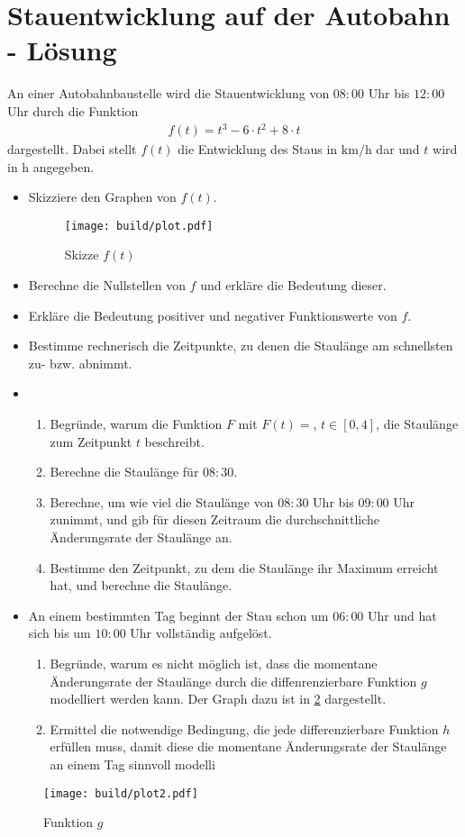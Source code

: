



\section{Stauentwicklung auf der Autobahn - Lösung}

An einer Autobahnbaustelle wird die Stauentwicklung von $08:00$ Uhr bis $12:00$ Uhr durch die Funktion
\begin{align*}
    f(t) = t^3-6\cdot t^2+8\cdot t
\end{align*}
dargestellt.
Dabei stellt $f(t)$ die Entwicklung des Staus in $\si{\kilo\meter\per\hour}$ dar und $t$ wird in $\si{\hour}$ angegeben.

\begin{itemize}
    \item Skizziere den Graphen von $f(t)$.
        \begin{figure}[H]
            \centering
            \texttt{[image: build/plot.pdf]}
            \caption{Skizze $f(t)$}
            \label{fig:f(t)}
        \end{figure}
    \item Berechne die Nullstellen von $f$ und erkläre die Bedeutung dieser.
    \item Erkläre die Bedeutung positiver und negativer Funktionswerte von $f$.
    \item Bestimme rechnerisch die Zeitpunkte, zu denen die Staulänge am schnellsten zu- bzw. abnimmt.
    \item 
        \begin{enumerate}
            \item Begründe, warum die Funktion $F$ mit $F(t) = $, $t \in \left[0,4\right]$, die Staulänge zum Zeitpunkt $t$ beschreibt.
            \item Berechne die Staulänge für $08:30$.
            \item Berechne, um wie viel die Staulänge von $08:30$ Uhr bis $09:00$ Uhr zunimmt, und gib für diesen Zeitraum die durchschnittliche Änderungsrate der Staulänge an.
            \item Bestimme den Zeitpunkt, zu dem die Staulänge ihr Maximum erreicht hat, und berechne die Staulänge.
        \end{enumerate}
    \item An einem bestimmten Tag beginnt der Stau schon um $06:00$ Uhr und hat sich bis um $10:00$ Uhr vollständig aufgelöst.
        \begin{enumerate}
            \item Begründe, warum es nicht möglich ist, dass die momentane Änderungsrate der Staulänge durch die diffenrenzierbare Funktion $g$ modelliert werden kann.
                Der Graph dazu ist in \ref{fig:g} dargestellt.
            \item Ermittel die notwendige Bedingung, die jede differenzierbare Funktion $h$ erfüllen muss, damit diese die momentane Änderungsrate der Staulänge an einem Tag sinnvoll modelli
        \end{enumerate}
\end{itemize}
\begin{figure}
    \centering
    \texttt{[image: build/plot2.pdf]}
    \caption{Funktion $g$}
    \label{fig:g}
\end{figure}



